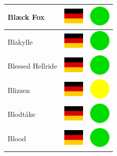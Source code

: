 \documentclass[12pt, a4paper, twoside]{report}
\begin{document}
\begin{center}
\begin{longtable}{|p{5cm}|p{2cm}|p{2cm}|}
 Blæck Fox                                                  & \includegraphics[width=1cm]{../img/flags/de} &   \includegraphics[width=1cm]{../likes/y} \\ \hline
 Blakylle                                                   & \includegraphics[width=1cm]{../img/flags/de} &   \includegraphics[width=1cm]{../likes/y} \\ \hline
 Blessed Hellride                                           & \includegraphics[width=1cm]{../img/flags/de} &   \includegraphics[width=1cm]{../likes/y} \\ \hline
 Blizzen                                                    & \includegraphics[width=1cm]{../img/flags/de} &   \includegraphics[width=1cm]{../likes/m} \\ \hline
 Blodtåke                                                   & \includegraphics[width=1cm]{../img/flags/de} &   \includegraphics[width=1cm]{../likes/y} \\ \hline
 Blood                                                      & \includegraphics[width=1cm]{../img/flags/de} &   \includegraphics[width=1cm]{../likes/y} \\ \hline

\end{longtable}
\end{center}
\end{document}

